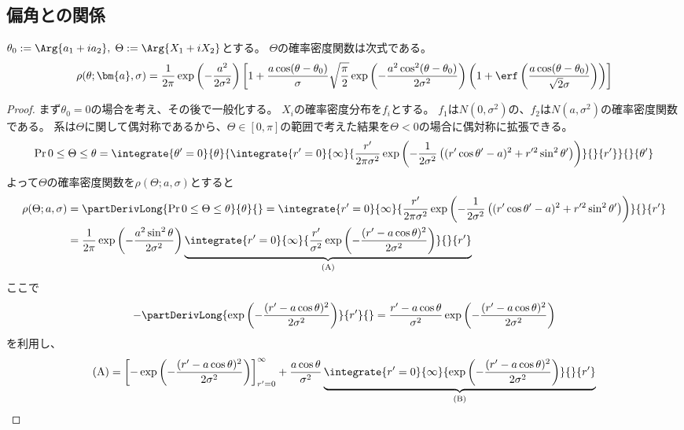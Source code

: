         \subsection{偏角との関係}
            \begin{shadebox}
                $\theta_0 := \Arg{a_1 + ia_2},\;\Theta := \Arg{X_1 + iX_2}$とする。
                $\Theta$の確率密度関数は次式である。
                {\small \[ \rho(\theta;\bm{a},\sigma) = \frac{1}{2\pi}\exp\left(-\frac{a^2}{2\sigma^2}\right)\left[1+\frac{a\cos(\theta-\theta_0)}{\sigma}\sqrt{\frac{\pi}{2}}\exp\left(-\frac{a^2\cos^2(\theta-\theta_0)}{2\sigma^2}\right)\left(1+\erf\left(\frac{a\cos(\theta-\theta_0)}{\sqrt{2}\sigma}\right)\right)\right] \]}
            \end{shadebox}
            \begin{proof}
                \quad\par
                まず$\theta_0 = 0$の場合を考え、その後で一般化する。
                $X_i$の確率密度分布を$f_i$とする。
                $f_1$は$N(0,\sigma^2)$の、$f_2$は$N(a,\sigma^2)$の確率密度関数である。
                系は$\Theta$に関して偶対称であるから、$\Theta\in[0,\pi]$の範囲で考えた結果を$\Theta<0$の場合に偶対称に拡張できる。
                \[ \Pr{0\leq\Theta\leq\theta} = \integrate{\theta'=0}{\theta}{\integrate{r'=0}{\infty}{\frac{r'}{2\pi\sigma^2}\exp\left(-\frac{1}{2\sigma^2}\left((r'\cos\theta'-a)^2+r'^2\sin^2\theta'\right)\right)}{}{r'}}{}{\theta'} \]
                よって$\Theta$の確率密度関数を$\rho(\Theta;a,\sigma)$とすると
                \begin{align*}
                    \rho(\Theta;a,\sigma) &= \partDerivLong{\Pr{0\leq\Theta\leq\theta}}{\theta}{} = \integrate{r'=0}{\infty}{\frac{r'}{2\pi\sigma^2}\exp\left(-\frac{1}{2\sigma^2}\left((r'\cos\theta'-a)^2+r'^2\sin^2\theta'\right)\right)}{}{r'} \\\
                    &= \frac{1}{2\pi}\exp\left(-\frac{a^2\sin^2\theta}{2\sigma^2}\right)\underbrace{\integrate{r'=0}{\infty}{\frac{r'}{\sigma^2}\exp\left(-\frac{(r'-a\cos\theta)^2}{2\sigma^2}\right)}{}{r'}}_{\text{(A)}}
                \end{align*}
                ここで
                \[ -\partDerivLong{\exp\left(-\frac{(r'-a\cos\theta)^2}{2\sigma^2}\right)}{r'}{} = \frac{r'-a\cos\theta}{\sigma^2}\exp\left(-\frac{(r'-a\cos\theta)^2}{2\sigma^2}\right) \]
                を利用し、
                \begin{align*}
                    \text{(A)} &= \left[-\exp\left(-\frac{(r'-a\cos\theta)^2}{2\sigma^2}\right)\right]_{r'=0}^\infty + \frac{a\cos\theta}{\sigma^2}\underbrace{\integrate{r'=0}{\infty}{\exp\left(-\frac{(r'-a\cos\theta)^2}{2\sigma^2}\right)}{}{r'}}_{\text{(B)}} \\

\end{align*}
\end{proof}
